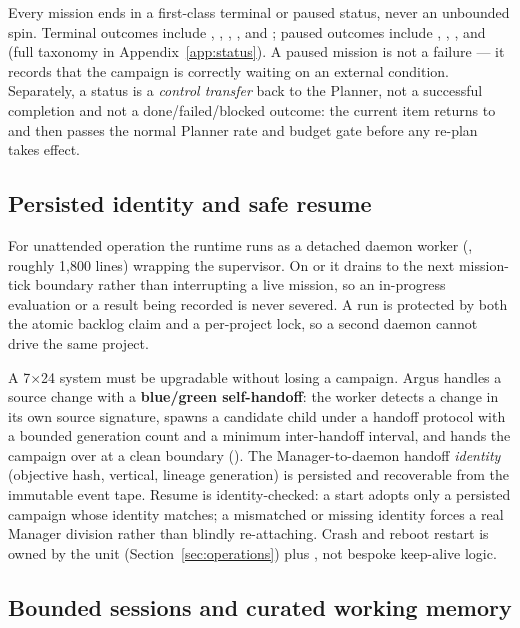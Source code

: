 Every mission ends in a first-class terminal or paused status, never an unbounded
spin. Terminal outcomes include , , ,
, and ; paused outcomes include ,
, , and
 (full taxonomy in Appendix~\ref{app:status}). A paused mission
is not a failure --- it records that the campaign is correctly waiting on an external
condition. Separately, a  status is a \emph{control
transfer} back to the Planner, not a successful completion and not a
done/failed/blocked outcome: the current item returns to  and then
passes the normal Planner rate and budget gate before any re-plan takes effect.

\subsection{Persisted identity and safe resume}

For unattended operation the runtime runs as a detached daemon worker
(, roughly 1{,}800 lines) wrapping the supervisor.
On  or  it drains to the next mission-tick boundary rather
than interrupting a live mission, so an in-progress evaluation or a result being
recorded is never severed. A run is protected by both the atomic backlog claim and a
per-project  lock, so a second daemon cannot drive the same project.

A 7$\times$24 system must be upgradable without losing a campaign. Argus handles a
source change with a \textbf{blue/green self-handoff}: the worker detects a change in
its own source signature, spawns a candidate child under a handoff protocol with a
bounded generation count and a minimum inter-handoff interval, and hands the campaign
over at a clean boundary (). The Manager-to-daemon handoff
\emph{identity} (objective hash, vertical, lineage generation) is persisted and
recoverable from the immutable event tape. Resume is identity-checked: a
 start adopts only a persisted campaign whose identity
matches; a mismatched or missing identity forces a real Manager division rather than
blindly re-attaching. Crash and reboot restart is owned by the 
unit (Section~\ref{sec:operations}) plus , not bespoke
keep-alive logic.

\subsection{Bounded sessions and curated working memory}

